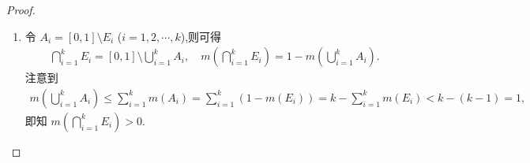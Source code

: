 \documentclass[../../main.tex]{subfiles}%
\begin{document}
\begin{proof}
\begin{enumerate}[(1)]
若$\mathring{E}\neq \varnothing$,设$x_0\in \mathring{E}$,则存在$\delta>0$,使得$B(x_0,\delta)\subseteq E$.于是$0<2\delta=m(B(x_0,\delta))\leqslant m(E)=0$,矛盾!

\item 令 $A_i=[0,1]\setminus E_i$ ($i=1,2,\cdots,k$),则可得
\begin{align*}
\bigcap\limits_{i=1}^{k}E_i=[0,1]\setminus\bigcup\limits_{i=1}^{k}A_i,\quad m\left(\bigcap\limits_{i=1}^{k}E_i\right)=1-m\left(\bigcup\limits_{i=1}^{k}A_i\right).
\end{align*}
注意到
\begin{align*}
m\left(\bigcup\limits_{i=1}^{k}A_i\right)\leqslant\sum\limits_{i=1}^{k}m(A_i)=\sum\limits_{i=1}^{k}(1-m(E_i))
=k-\sum\limits_{i=1}^{k}m(E_i)<k-(k-1)=1,
\end{align*}
即知 $m\left(\bigcap\limits_{i=1}^{k}E_i\right)>0$.
\end{enumerate}
\end{proof}
\end{document}
